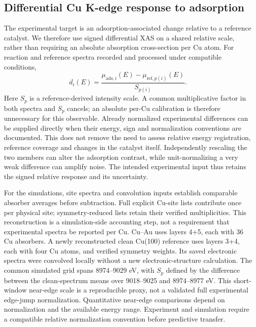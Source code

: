 \documentclass[11pt,a4paper]{article}
\begin{document}
\subsection{Differential Cu K-edge response to adsorption}
The experimental target is an adsorption-associated change relative to a reference catalyst. We therefore use signed differential XAS on a shared relative scale, rather than requiring an absolute absorption cross-section per Cu atom. For reaction and reference spectra recorded and processed under compatible conditions,
\begin{equation}
d_i(E)=\frac{\mu_{\mathrm{ads},i}(E)-\mu_{\mathrm{ref},p(i)}(E)}{S_{p(i)}}.
\label{eq:delta}
\end{equation}
Here $S_p$ is a reference-derived intensity scale. A common multiplicative factor in both spectra and $S_p$ cancels; an absolute per-Cu calibration is therefore unnecessary for this observable. Already normalized experimental differences can be supplied directly when their energy, sign and normalization conventions are documented. This does not remove the need to assess relative energy registration, reference coverage and changes in the catalyst itself. Independently rescaling the two members can alter the adsorption contrast, while unit-normalizing a very weak difference can amplify noise. The intended experimental input thus retains the signed relative response and its uncertainty.

For the simulations, site spectra and convolution inputs establish comparable absorber averages before subtraction. Full explicit Cu-site lists contribute once per physical site; symmetry-reduced lists retain their verified multiplicities. This reconstruction is a simulation-side accounting step, not a requirement that experimental spectra be reported per Cu. Cu--Au uses layers 4+5, each with 36 Cu absorbers. A newly reconstructed clean Cu(100) reference uses layers 3+4, each with four Cu atoms, and verified symmetry weights. Its saved electronic spectra were convolved locally without a new electronic-structure calculation. The common simulated grid spans 8974--9029 eV, with $S_p$ defined by the difference between the clean-spectrum means over 9018--9025 and 8974--8977 eV. This short-window near-edge scale is a reproducible proxy, not a validated full experimental edge-jump normalization. Quantitative near-edge comparisons depend on normalization and the available energy range.\cite{weng2005,bugarin2024} Experiment and simulation require a compatible relative normalization convention before predictive transfer.
\end{document}
